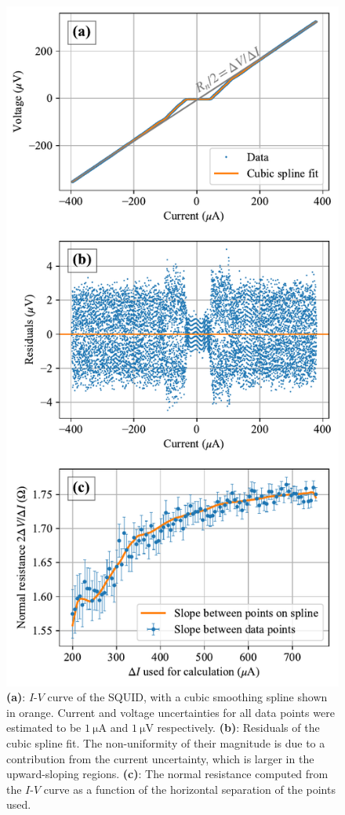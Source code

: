 \documentclass[twocol]{ametsocV6.1}
\begin{document}
\begin{figure}[ht]
	\centering
	\includegraphics[width=\linewidth]{../figures/iv.pdf}
	\caption{
		\textbf{(a)}: $I$-$V$ curve of the SQUID, with a cubic smoothing spline
		shown in orange. Current and voltage uncertainties for all data points
		were estimated to be $\SI{1}{\micro\ampere}$ and $\SI{1}{\micro\volt}$
		respectively.
		\textbf{(b)}: Residuals of the cubic spline fit. The non-uniformity
		of their magnitude is due to a contribution from the current
		uncertainty, which is larger in the upward-sloping regions.
		\textbf{(c)}: The normal resistance computed from the $I$-$V$ curve
		as a function of the horizontal separation of the points used.
	}
	\label{fig:iv}
\end{figure}
\end{document}
